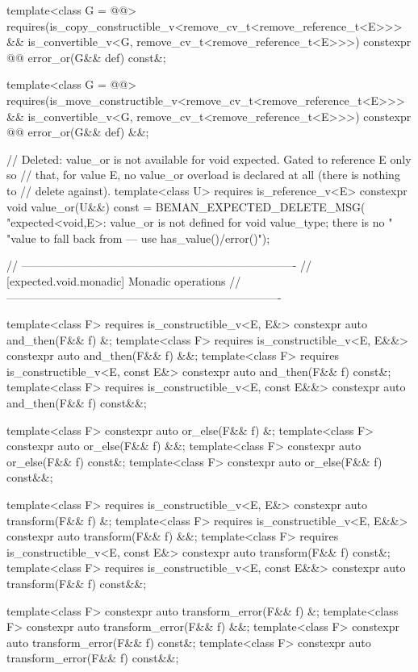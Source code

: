 \begin{codeblock}
{  template<class G = @@>
    requires(is_copy_constructible_v<remove_cv_t<remove_reference_t<E>>> &&
             is_convertible_v<G, remove_cv_t<remove_reference_t<E>>>)
  constexpr @@ error_or(G&& def) const&;

  template<class G = @@>
    requires(is_move_constructible_v<remove_cv_t<remove_reference_t<E>>> &&
             is_convertible_v<G, remove_cv_t<remove_reference_t<E>>>)
  constexpr @@ error_or(G&& def) &&;

  // Deleted: value_or is not available for void expected. Gated to reference E only so
  // that, for value E, no value_or overload is declared at all (there is nothing to
  // delete against).
  template<class U>
    requires is_reference_v<E>
  constexpr void value_or(U&&) const = BEMAN_EXPECTED_DELETE_MSG(
      "expected<void,E>: value_or is not defined for void value_type; there is no "
      "value to fall back from — use has_value()/error()");

  // -------------------------------------------------------------------------
  // [expected.void.monadic] Monadic operations
  // -------------------------------------------------------------------------

  template<class F>
    requires is_constructible_v<E, E&>
  constexpr auto and_then(F&& f) &;
  template<class F>
    requires is_constructible_v<E, E&&>
  constexpr auto and_then(F&& f) &&;
  template<class F>
    requires is_constructible_v<E, const E&>
  constexpr auto and_then(F&& f) const&;
  template<class F>
    requires is_constructible_v<E, const E&&>
  constexpr auto and_then(F&& f) const&&;

  template<class F> constexpr auto or_else(F&& f) &;
  template<class F> constexpr auto or_else(F&& f) &&;
  template<class F> constexpr auto or_else(F&& f) const&;
  template<class F> constexpr auto or_else(F&& f) const&&;

  template<class F>
    requires is_constructible_v<E, E&>
  constexpr auto transform(F&& f) &;
  template<class F>
    requires is_constructible_v<E, E&&>
  constexpr auto transform(F&& f) &&;
  template<class F>
    requires is_constructible_v<E, const E&>
  constexpr auto transform(F&& f) const&;
  template<class F>
    requires is_constructible_v<E, const E&&>
  constexpr auto transform(F&& f) const&&;

  template<class F> constexpr auto transform_error(F&& f) &;
  template<class F> constexpr auto transform_error(F&& f) &&;
  template<class F> constexpr auto transform_error(F&& f) const&;
  template<class F> constexpr auto transform_error(F&& f) const&&;

}
\end{codeblock}
